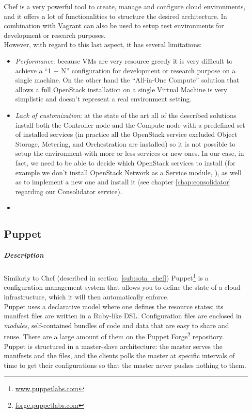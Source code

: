Chef is a very powerful tool to create, manage and configure cloud environments, and it offers a lot of functionalities to structure the desired architecture. In combination with Vagrant can also be used to setup test environments for development or research purposes.\\
However, with regard to this last aspect, it has several limitations:
\begin{itemize}
\item \textit{Performance}: because VMs are very resource greedy it is very difficult to achieve a ``1 + N'' configuration for development or research purpose on a single machine. On the other hand the ``All-in-One Compute'' solution that allows a full OpenStack installation on a single Virtual Machine is very simplistic and doesn't represent a real environment setting.
\item \textit{Lack of customization}: at the state of the art all of the described solutions install both the Controller node and the Compute node with a predefined set of installed services (in practice all the OpenStack service excluded Object Storage, Metering, and Orchestration are installed) so it is not possible to setup the environment with more or less services or new ones. In our case, in fact, we need to be able to decide which OpenStack services to install (for example we don't install OpenStack Network as a Service module, ), as well as to implement a new one and install it (see chapter \ref{chap:consolidator} regarding our Consolidator service).
\item {}
\end{itemize}




\subsection{Puppet}
\label{sub:sota_puppet}

\subparagraph{Description}
\label{subp:sota_puppet_desc}

Similarly to Chef (described in section~\ref{sub:sota_chef}) Puppet\footnote{\url{www.puppetlabs.com}} is a configuration management system that allows you to define the state of a cloud infrastructure, which it will then automatically enforce.\\
Puppet uses a declarative model where one defines the resource states; its manifest files are written in a Ruby-like DSL. Configuration files are enclosed in \textit{modules}, self-contained bundles of code and data that are easy to share and reuse. There are a large amount of them on the Puppet Forge\footnote{\url{forge.puppetlabs.com}} repository.\\
Puppet is structured in a master-slave architecture: the master serves the manifests and the files, and the clients polls the master at specific intervals of time to get their configurations so that the master never pushes nothing to them.


